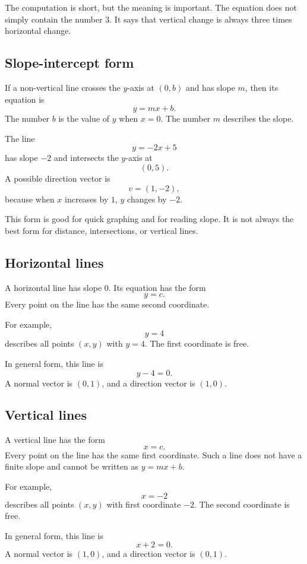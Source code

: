 The computation is short, but the meaning is important. The equation does not simply contain the number \(3\). It says that vertical change is always three times horizontal change.

\subsection*{Slope-intercept form}

If a non-vertical line crosses the \(y\)-axis at \((0,b)\) and has slope \(m\), then its equation is
\[
y=mx+b.
\]
The number \(b\) is the value of \(y\) when \(x=0\). The number \(m\) describes the slope.

\begin{examplebox}
The line
\[
y=-2x+5
\]
has slope \(-2\) and intersects the \(y\)-axis at
\[
(0,5).
\]
A possible direction vector is
\[
v=(1,-2),
\]
because when \(x\) increases by \(1\), \(y\) changes by \(-2\).
\end{examplebox}

This form is good for quick graphing and for reading slope. It is not always the best form for distance, intersections, or vertical lines.

\subsection*{Horizontal lines}

A horizontal line has slope \(0\). Its equation has the form
\[
y=c.
\]
Every point on the line has the same second coordinate.

For example,
\[
y=4
\]
describes all points \((x,y)\) with \(y=4\). The first coordinate is free.

In general form, this line is
\[
y-4=0.
\]
A normal vector is \((0,1)\), and a direction vector is \((1,0)\).

\subsection*{Vertical lines}

A vertical line has the form
\[
x=c.
\]
Every point on the line has the same first coordinate. Such a line does not have a finite slope and cannot be written as \(y=mx+b\).

For example,
\[
x=-2
\]
describes all points \((x,y)\) with first coordinate \(-2\). The second coordinate is free.

In general form, this line is
\[
x+2=0.
\]
A normal vector is \((1,0)\), and a direction vector is \((0,1)\).

